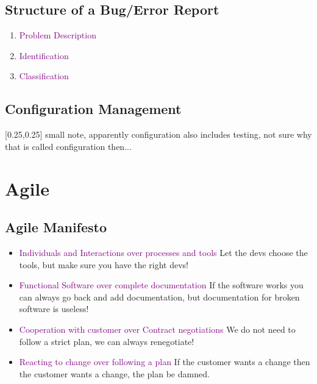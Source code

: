 \documentclass[main.tex,fontsize=12pt,paper=a4,paper=landscape,DIV=calc,]{scrartcl}
\begin{document}
\begin{multicols*}{2}
\subsection{Structure of a Bug/Error Report}
\begin{enumerate}
\item \textcolor{purple}{Problem Description}
\item \textcolor{purple}{Identification}
\item \textcolor{purple}{Classification}
\end{enumerate} 

\subsection{Configuration Management}
[0.25,0.25]
small note, apparently configuration also includes testing, not sure why that is called configuration then...

\section{Agile}
\subsection{Agile Manifesto}
\begin{itemize}
\item \textcolor{purple}{Individuals and Interactions over processes and tools}\newline
  Let the devs choose the tools, but make sure you have the right devs!
\item \textcolor{purple}{Functional Software over complete documentation}\newline
  If the software works you can always go back and add documentation, but documentation for broken software is useless!
\item \textcolor{purple}{Cooperation with customer over Contract negotiations}\newline
  We do not need to follow a strict plan, we can always renegotiate!
\item \textcolor{purple}{Reacting to change over following a plan}\newline
  If the customer wants a change then the customer wants a change, the plan be damned. 
\end{itemize} 


\end{multicols*}
\end{document}
